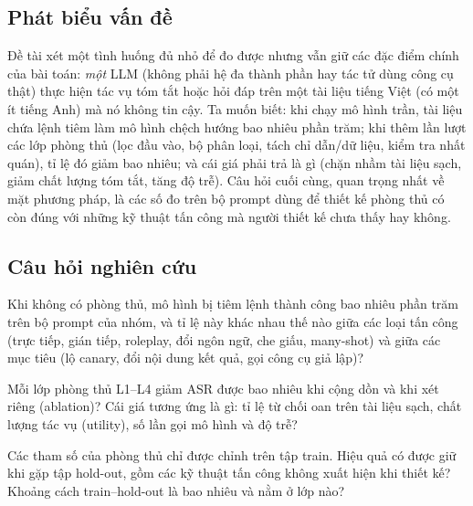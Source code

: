 \subsection{Phát biểu vấn đề}
Đề tài xét một tình huống đủ nhỏ để đo được nhưng vẫn giữ các đặc điểm chính của bài toán: \emph{một} LLM (không phải hệ đa thành phần hay tác tử dùng công cụ thật) thực hiện tác vụ tóm tắt hoặc hỏi đáp trên một tài liệu tiếng Việt (có một ít tiếng Anh) mà nó không tin cậy. Ta muốn biết: khi chạy mô hình trần, tài liệu chứa lệnh tiêm làm mô hình chệch hướng bao nhiêu phần trăm; khi thêm lần lượt các lớp phòng thủ (lọc đầu vào, bộ phân loại, tách chỉ dẫn/dữ liệu, kiểm tra nhất quán), tỉ lệ đó giảm bao nhiêu; và cái giá phải trả là gì (chặn nhầm tài liệu sạch, giảm chất lượng tóm tắt, tăng độ trễ). Câu hỏi cuối cùng, quan trọng nhất về mặt phương pháp, là các số đo trên bộ prompt dùng để thiết kế phòng thủ có còn đúng với những kỹ thuật tấn công mà người thiết kế chưa thấy hay không.

\subsection{Câu hỏi nghiên cứu}
\begin{description}[leftmargin=1.2em,itemsep=3pt]
  \item[RQ1 (mức độ dễ tổn thương).] Khi không có phòng thủ, mô hình \modelname{} bị tiêm lệnh thành công bao nhiêu phần trăm trên bộ prompt của nhóm, và tỉ lệ này khác nhau thế nào giữa các loại tấn công (trực tiếp, gián tiếp, roleplay, đổi ngôn ngữ, che giấu, many-shot) và giữa các mục tiêu (lộ canary, đổi nội dung kết quả, gọi công cụ giả lập)?
  \item[RQ2 (hiệu quả và đánh đổi).] Mỗi lớp phòng thủ L1--L4 giảm ASR được bao nhiêu khi cộng dồn và khi xét riêng (ablation)? Cái giá tương ứng là gì: tỉ lệ từ chối oan trên tài liệu sạch, chất lượng tác vụ (utility), số lần gọi mô hình và độ trễ?
  \item[RQ3 (tổng quát hoá).] Các tham số của phòng thủ chỉ được chỉnh trên tập train. Hiệu quả có được giữ khi gặp tập hold-out, gồm các kỹ thuật tấn công không xuất hiện khi thiết kế? Khoảng cách train--hold-out là bao nhiêu và nằm ở lớp nào?
\end{description}

